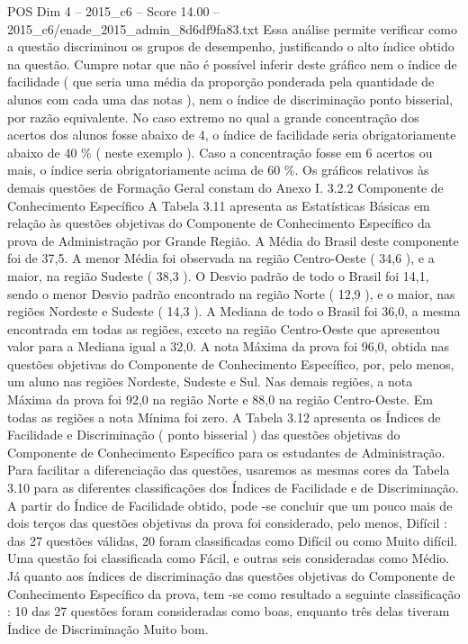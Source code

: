 \begin{textsample}{POS Dim 4 – 2015\_c6 – Score 14.00 – 2015\_c6/enade\_2015\_admin\_8d6df9fa83.txt}
Essa análise permite verificar como a questão discriminou os grupos de desempenho, justificando o alto índice obtido na questão.
Cumpre notar que não é possível inferir deste gráfico nem o índice de facilidade ( que seria uma média da proporção ponderada pela quantidade de alunos com cada uma das notas ), nem o índice de discriminação ponto bisserial, por razão equivalente.
No caso extremo no qual a grande concentração dos acertos dos alunos fosse abaixo de 4, o índice de facilidade seria obrigatoriamente abaixo de 40 \% ( neste exemplo ).
Caso a concentração fosse em 6 acertos ou mais, o índice seria obrigatoriamente acima de 60 \%.
Os gráficos relativos às demais questões de Formação Geral constam do Anexo I. 3.2.2 Componente de Conhecimento Específico A Tabela 3.11 apresenta as Estatísticas Básicas em relação às questões objetivas do Componente de Conhecimento Específico da prova de Administração por Grande Região.
A Média do Brasil deste componente foi de 37,5.
A menor Média foi observada na região Centro-Oeste ( 34,6 ), e a maior, na região Sudeste ( 38,3 ).
O Desvio padrão de todo o Brasil foi 14,1, sendo o menor Desvio padrão encontrado na região Norte ( 12,9 ), e o maior, nas regiões Nordeste e Sudeste ( 14,3 ).
A Mediana de todo o Brasil foi 36,0, a mesma encontrada em todas as regiões, exceto na região Centro-Oeste que apresentou valor para a Mediana igual a 32,0.
A nota Máxima da prova foi 96,0, obtida nas questões objetivas do Componente de Conhecimento Específico, por, pelo menos, um aluno nas regiões Nordeste, Sudeste e Sul.
Nas demais regiões, a nota Máxima da prova foi 92,0 na região Norte e 88,0 na região Centro-Oeste.
Em todas as regiões a nota Mínima foi zero.
A Tabela 3.12 apresenta os Índices de Facilidade e Discriminação ( ponto bisserial ) das questões objetivas do Componente de Conhecimento Específico para os estudantes de Administração.
Para facilitar a diferenciação das questões, usaremos as mesmas cores da Tabela 3.10 para as diferentes classificações dos Índices de Facilidade e de Discriminação.
A partir do Índice de Facilidade obtido, pode -se concluir que um pouco mais de dois terços das questões objetivas da prova foi considerado, pelo menos, Difícil : das 27 questões válidas, 20 foram classificadas como Difícil ou como Muito difícil.
Uma questão foi classificada como Fácil, e outras seis consideradas como Médio.
Já quanto aos índices de discriminação das questões objetivas do Componente de Conhecimento Específico da prova, tem -se como resultado a seguinte classificação : 10 das 27 questões foram consideradas como boas, enquanto três delas tiveram Índice de Discriminação Muito bom.

\end{textsample}
